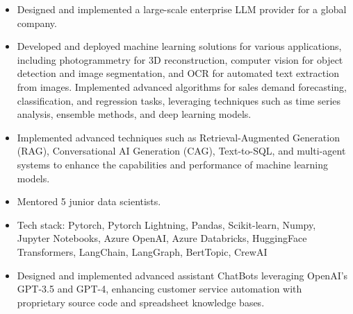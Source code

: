 \documentclass[10pt,a4paper]{altacv}
\begin{document}
{\small


\begin{itemize}
\item Designed and implemented a large-scale enterprise LLM provider for a global company.
\item Developed and deployed machine learning solutions for various applications, including photogrammetry for 3D reconstruction, computer vision for object detection and image segmentation, and OCR for automated text extraction from images. Implemented advanced algorithms for sales demand forecasting, classification, and regression tasks, leveraging techniques such as time series analysis, ensemble methods, and deep learning models.
\item Implemented advanced techniques such as Retrieval-Augmented Generation (RAG), Conversational AI Generation (CAG), Text-to-SQL, and multi-agent systems to enhance the capabilities and performance of machine learning models.
\item Mentored 5 junior data scientists.
\item Tech stack: Pytorch, Pytorch Lightning, Pandas, Scikit-learn, Numpy, Jupyter Notebooks, Azure OpenAI, Azure Databricks, HuggingFace Transformers, LangChain, LangGraph, BertTopic, CrewAI
\end{itemize}

\begin{itemize}
\item Designed and implemented advanced assistant ChatBots leveraging OpenAI's GPT-3.5 and GPT-4, enhancing customer service automation with proprietary source code and spreadsheet knowledge bases.
\end{itemize}

}
\end{document}
